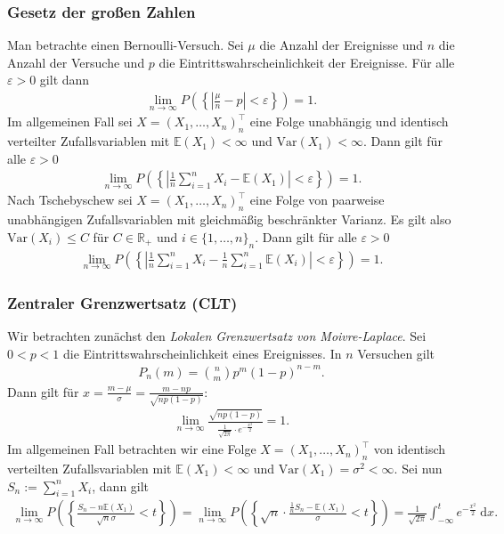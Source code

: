 \documentclass[10pt, a4paper, twoside]{extarticle}
\theoremstyle{nonumberplain}
\theoremstyle{plain}
\begin{document}
\subsubsection{Gesetz der großen Zahlen}
Man betrachte einen Bernoulli-Versuch. Sei $ \mu $ die Anzahl der Ereignisse und $ n $ die Anzahl der Versuche und $ p $ die Eintrittswahrscheinlichkeit der Ereignisse. Für alle $ \varepsilon>0 $ gilt dann \begin{align*}
\lim_{n\to\infty}P\left(\left\lbrace \left|\frac{\mu}{n}-p\right|<\varepsilon\right\rbrace\right)=1.
\end{align*}
Im allgemeinen Fall sei $ X=(X_1,\ldots,X_n)^\top_n $ eine Folge unabhängig und identisch verteilter Zufallsvariablen mit $ \mathbb{E}(X_1)<\infty $ und $ \mathrm{Var}(X_1)<\infty $. Dann gilt für alle $ \varepsilon>0 $ \begin{align*}
\lim_{n\to\infty}P\left(\left\lbrace\left|\frac{1}{n}\sum_{i=1}^{n} X_i-\mathbb{E}(X_1)\right|<\varepsilon\right\rbrace\right)=1.
\end{align*}
Nach Tschebyschew sei $ X=(X_1,\ldots,X_n)^\top_n $ eine Folge von paarweise unabhängigen Zufallsvariablen mit gleichmäßig beschränkter Varianz. Es gilt also $ \mathrm{Var}(X_i)\leq C $ für $ C\in\mathbb{R}_+ $ und $ i\in\{1,\ldots,n\}_n $. Dann gilt für alle $ \varepsilon>0 $ \begin{align*}
\lim_{n\to \infty} P\left(\left\lbrace\left|\frac{1}{n}\sum_{i=1}^{n} X_i-\frac{1}{n}\sum_{i=1}^{n} \mathbb{E}(X_i)\right|<\varepsilon\right\rbrace\right)=1.
\end{align*}

\subsubsection{Zentraler Grenzwertsatz (CLT)}
Wir betrachten zunächst den \emph{Lokalen Grenzwertsatz von Moivre-Laplace}. Sei $ 0<p<1 $ die Eintrittswahrscheinlichkeit eines Ereignisses. In $ n $ Versuchen gilt \begin{align*}
P_n(m)=\binom{n}{m}p^m(1-p)^{n-m}.
\end{align*}
Dann gilt für $ x=\frac{m-\mu}{\sigma}=\frac{m-np}{\sqrt{np(1-p)}} $:\begin{align*}
\lim_{n\to \infty} \frac{\sqrt{np(1-p)}}{\frac{1}{\sqrt{2\pi}}\cdot e^{-\frac{x^2}{2}}}=1.
\end{align*}
Im allgemeinen Fall betrachten wir eine Folge $ X=(X_1,\ldots,X_n)^\top_n $ von identisch verteilten Zufallsvariablen  mit $ \mathbb{E}(X_1)<\infty $ und $ \mathrm{Var}(X_1)=\sigma^2<\infty $. Sei nun $ S_n:=\sum_{i=1}^{n} X_i $, dann gilt \begin{align*}
\lim_{n\to \infty} P\left(\left\lbrace\frac{S_n-n\mathbb{E}(X_1)}{\sqrt{n}\sigma}<t\right\rbrace\right)=\lim_{n\to \infty} P\left(\left\lbrace\sqrt{n}\cdot\frac{\frac{1}{n} S_n-\mathbb{E}(X_1)}{\sigma}<t\right\rbrace\right)=\frac{1}{\sqrt{2\pi}}\int_{-\infty}^{t} e^{-\frac{x^2}{2}}\ \mathrm{d}x.
\end{align*}
\end{document}
